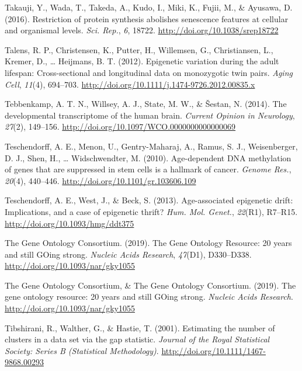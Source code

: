 \documentclass[12pt,twoside]{unicam}
\begin{document}
\begin{cslreferences}
\leavevmode\hypertarget{ref-Takauji2016}{}%
Takauji, Y., Wada, T., Takeda, A., Kudo, I., Miki, K., Fujii, M., \& Ayusawa, D. (2016). Restriction of protein synthesis abolishes senescence features at cellular and organismal levels. \emph{Sci. Rep.}, \emph{6}, 18722. \url{http://doi.org/10.1038/srep18722}

\leavevmode\hypertarget{ref-Talens2012}{}%
Talens, R. P., Christensen, K., Putter, H., Willemsen, G., Christiansen, L., Kremer, D., \ldots{} Heijmans, B. T. (2012). Epigenetic variation during the adult lifespan: Cross-sectional and longitudinal data on monozygotic twin pairs. \emph{Aging Cell}, \emph{11}(4), 694--703. \url{http://doi.org/10.1111/j.1474-9726.2012.00835.x}

\leavevmode\hypertarget{ref-Tebbenkamp2014}{}%
Tebbenkamp, A. T. N., Willsey, A. J., State, M. W., \& Šestan, N. (2014). The developmental transcriptome of the human brain. \emph{Current Opinion in Neurology}, \emph{27}(2), 149--156. \url{http://doi.org/10.1097/WCO.0000000000000069}

\leavevmode\hypertarget{ref-Teschendorff2010}{}%
Teschendorff, A. E., Menon, U., Gentry-Maharaj, A., Ramus, S. J., Weisenberger, D. J., Shen, H., \ldots{} Widschwendter, M. (2010). Age-dependent DNA methylation of genes that are suppressed in stem cells is a hallmark of cancer. \emph{Genome Res.}, \emph{20}(4), 440--446. \url{http://doi.org/10.1101/gr.103606.109}

\leavevmode\hypertarget{ref-Teschendorff2013}{}%
Teschendorff, A. E., West, J., \& Beck, S. (2013). Age-associated epigenetic drift: Implications, and a case of epigenetic thrift? \emph{Hum. Mol. Genet.}, \emph{22}(R1), R7--R15. \url{http://doi.org/10.1093/hmg/ddt375}

\leavevmode\hypertarget{ref-TheGeneOntologyConsortium2019}{}%
The Gene Ontology Consortium. (2019). The Gene Ontology Resource: 20 years and still GOing strong. \emph{Nucleic Acids Research}, \emph{47}(D1), D330--D338. \url{http://doi.org/10.1093/nar/gky1055}

\leavevmode\hypertarget{ref-The_Gene_Ontology_Consortium2019}{}%
The Gene Ontology Consortium, \& The Gene Ontology Consortium. (2019). The gene ontology resource: 20 years and still GOing strong. \emph{Nucleic Acids Research}. \url{http://doi.org/10.1093/nar/gky1055}

\leavevmode\hypertarget{ref-Tibshirani2001}{}%
Tibshirani, R., Walther, G., \& Hastie, T. (2001). Estimating the number of clusters in a data set via the gap statistic. \emph{Journal of the Royal Statistical Society: Series B (Statistical Methodology)}. \url{http://doi.org/10.1111/1467-9868.00293}


\end{cslreferences}
\end{document}
